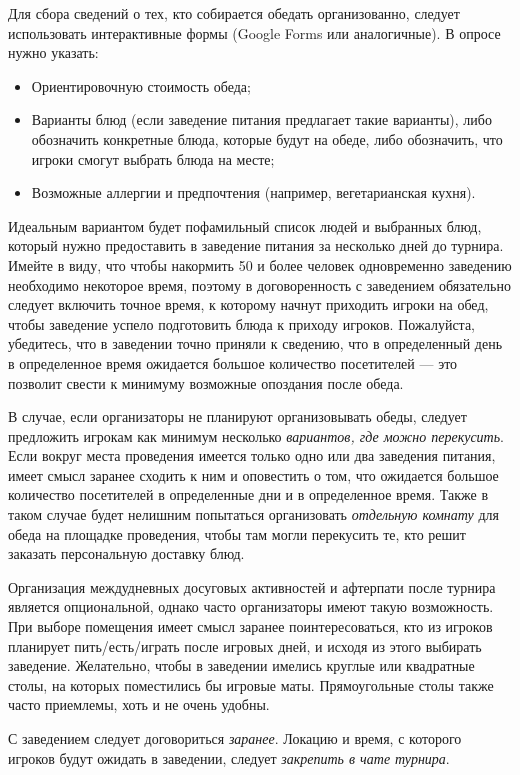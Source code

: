 Для сбора сведений о тех, кто собирается обедать организованно, следует использовать интерактивные формы (Google Forms или аналогичные). В опросе нужно указать:
\begin{itemize}
	\item Ориентировочную стоимость обеда;
	\item Варианты блюд (если заведение питания предлагает такие варианты), либо обозначить конкретные блюда, которые будут на обеде, либо обозначить, что игроки смогут выбрать блюда на месте;
	\item Возможные аллергии и предпочтения (например, вегетарианская кухня).
\end{itemize}

Идеальным вариантом будет пофамильный список людей и выбранных блюд, который нужно предоставить в заведение питания за несколько дней до турнира. Имейте в виду, что чтобы накормить 50 и более человек одновременно заведению необходимо некоторое время, поэтому в договоренность с заведением обязательно следует включить точное время, к которому начнут приходить игроки на обед, чтобы заведение успело подготовить блюда к приходу игроков. Пожалуйста, убедитесь, что в заведении точно приняли к сведению, что в определенный день в определенное время ожидается большое количество посетителей --- это позволит свести к минимуму возможные опоздания после обеда.

В случае, если организаторы не планируют организовывать обеды, следует предложить игрокам как минимум несколько \textit{вариантов, где можно перекусить}. Если вокруг места проведения имеется только одно или два заведения питания, имеет смысл заранее сходить к ним и оповестить о том, что ожидается большое количество посетителей в определенные дни и в определенное время. Также в таком случае будет нелишним попытаться организовать \textit{отдельную комнату} для обеда на площадке проведения, чтобы там могли перекусить те, кто решит заказать персональную доставку блюд.

Организация междудневных досуговых активностей и афтерпати после турнира является опциональной, однако часто организаторы имеют такую возможность. При выборе помещения имеет смысл заранее поинтересоваться, кто из игроков планирует пить/есть/играть после игровых дней, и исходя из этого выбирать заведение. Желательно, чтобы в заведении имелись круглые или квадратные столы, на которых поместились бы игровые маты. Прямоугольные столы также часто приемлемы, хоть и не очень удобны.

С заведением следует договориться \textit{заранее}. Локацию и время, с которого игроков будут ожидать в заведении, следует \textit{закрепить в чате турнира}.


